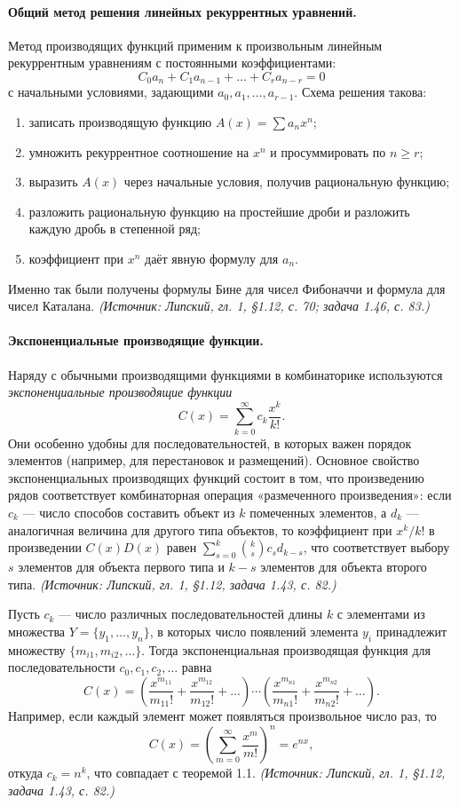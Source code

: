 \documentclass[a4paper,12pt]{article}
\begin{document}
\paragraph{Общий метод решения линейных рекуррентных уравнений.}
Метод производящих функций применим к произвольным линейным рекуррентным уравнениям с постоянными коэффициентами:
\[
C_0a_n+C_1a_{n-1}+\dots+C_ra_{n-r}=0
\]
с начальными условиями, задающими \(a_0,a_1,\dots,a_{r-1}\). Схема решения такова:
\begin{enumerate}[label=\arabic*)]
\item записать производящую функцию \(A(x)=\sum a_nx^n\);
\item умножить рекуррентное соотношение на \(x^n\) и просуммировать по \(n\ge r\);
\item выразить \(A(x)\) через начальные условия, получив рациональную функцию;
\item разложить рациональную функцию на простейшие дроби и разложить каждую дробь в степенной ряд;
\item коэффициент при \(x^n\) даёт явную формулу для \(a_n\).
\end{enumerate}
Именно так были получены формулы Бине для чисел Фибоначчи и формула для чисел Каталана.
\textit{(Источник: Липский, гл. 1, §1.12, с. 70; задача 1.46, с. 83.)}

\paragraph{Экспоненциальные производящие функции.}
Наряду с обычными производящими функциями в комбинаторике используются \emph{экспоненциальные производящие функции}
\[
C(x)=\sum_{k=0}^{\infty}c_k\frac{x^k}{k!}.
\]
Они особенно удобны для последовательностей, в которых важен порядок элементов (например, для перестановок и размещений). Основное свойство экспоненциальных производящих функций состоит в том, что произведению рядов соответствует комбинаторная операция «размеченного произведения»: если \(c_k\) --- число способов составить объект из \(k\) помеченных элементов, а \(d_k\) --- аналогичная величина для другого типа объектов, то коэффициент при \(x^k/k!\) в произведении \(C(x)D(x)\) равен \(\sum_{s=0}^{k}\binom{k}{s}c_sd_{k-s}\), что соответствует выбору \(s\) элементов для объекта первого типа и \(k-s\) элементов для объекта второго типа.
\textit{(Источник: Липский, гл. 1, §1.12, задача 1.43, с. 82.)}

Пусть \(c_k\) --- число различных последовательностей длины \(k\) с элементами из множества \(Y=\{y_1,\dots,y_n\}\), в которых число появлений элемента \(y_i\) принадлежит множеству \(\{m_{i1},m_{i2},\dots\}\). Тогда экспоненциальная производящая функция для последовательности \(c_0,c_1,c_2,\dots\) равна
\[
C(x)=\left(\frac{x^{m_{11}}}{m_{11}!}+\frac{x^{m_{12}}}{m_{12}!}+\dots\right)\cdots\left(\frac{x^{m_{n1}}}{m_{n1}!}+\frac{x^{m_{n2}}}{m_{n2}!}+\dots\right).
\]
Например, если каждый элемент может появляться произвольное число раз, то
\[
C(x)=\left(\sum_{m=0}^{\infty}\frac{x^m}{m!}\right)^n=e^{nx},
\]
откуда \(c_k=n^k\), что совпадает с теоремой 1.1.
\textit{(Источник: Липский, гл. 1, §1.12, задача 1.43, с. 82.)}
\end{document}
